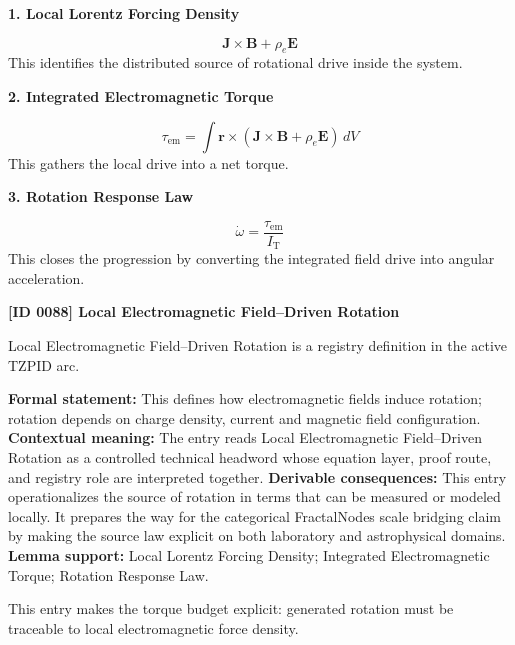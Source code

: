 \noindent\textbf{1. Local Lorentz Forcing Density}\par
\[
\mathbf{J}\times\mathbf{B}+\rho_e\mathbf{E}
\]
\noindent This identifies the distributed source of rotational drive inside the system.\par
\noindent\textbf{2. Integrated Electromagnetic Torque}\par
\[
\tau_{\mathrm{em}}
=
\int \mathbf{r}\times\left(\mathbf{J}\times\mathbf{B}+\rho_e\mathbf{E}\right)\,dV
\]
\noindent This gathers the local drive into a net torque.\par
\noindent\textbf{3. Rotation Response Law}\par
\[
\dot{\omega}=\frac{\tau_{\mathrm{em}}}{I_{\mathrm{T}}}
\]
\noindent This closes the progression by converting the integrated field drive into angular acceleration.\par

\clearpage
\noindent\textbf{[ID 0088] Local Electromagnetic Field--Driven Rotation}\par
\vspace{0.35em}
\begingroup\small
{}
Local Electromagnetic Field--Driven Rotation is a registry definition in the active TZPID arc.

\begingroup\footnotesize\setlength{\emergencystretch}{3em}\sloppy
\textbf{Formal statement:} This defines how electromagnetic fields induce rotation; rotation depends on charge density, current and magnetic field configuration. \textbf{Contextual meaning:} The entry reads Local Electromagnetic Field--Driven Rotation as a controlled technical headword whose equation layer, proof route, and registry role are interpreted together. \textbf{Derivable consequences:} This entry operationalizes the source of rotation in terms that can be measured or modeled locally. It prepares the way for the categorical FractalNodes scale bridging claim by making the source law explicit on both laboratory and astrophysical domains. \textbf{Lemma support:} Local Lorentz Forcing Density; Integrated Electromagnetic Torque; Rotation Response Law.\par
\endgroup

This entry makes the torque budget explicit: generated rotation must be traceable to local electromagnetic force density.

